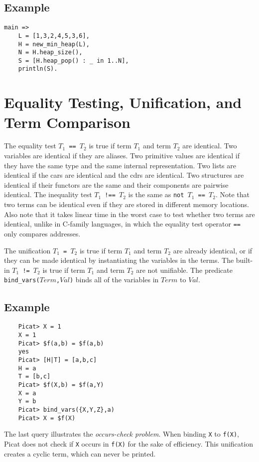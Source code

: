 \subsection*{Example}
\begin{verbatim}
main =>
    L = [1,3,2,4,5,3,6],
    H = new_min_heap(L),
    N = H.heap_size(),
    S = [H.heap_pop() : _ in 1..N],
    println(S).
\end{verbatim}

\section{\label{sec:unification}Equality Testing, Unification, and Term Comparison}
The equality test \texttt{$T_1$ == $T_2$}  is true if term $T_1$ and term $T_2$ are identical. Two variables are identical if they are aliases. Two primitive values are identical if they have the same type and the same internal representation. Two lists are identical if the cars are identical and the cdrs are identical. Two structures are identical if their functors are the same and their components are pairwise identical. The inequality test \texttt{$T_1$ !== $T_2$}  is the same as \texttt{not $T_1$ == $T_2$}.  Note that two terms can be identical even if they are stored in different memory locations.  Also note that it takes linear time in the worst case to test whether two terms are identical, unlike in C-family languages, in which the equality test operator \texttt{==} only compares addresses.

The unification \texttt{$T_1$ = $T_2$}  is true if term $T_1$ and term $T_2$ are already identical, or if they can be made identical by instantiating the variables in the terms. The built-in \texttt{$T_1$ != $T_2$}  is true if term $T_1$ and term $T_2$ are not unifiable. The predicate \texttt{bind\_vars($Term$,$Val$)} binds all of the variables in $Term$ to $Val$.

\subsection*{Example}
\begin{verbatim}
    Picat> X = 1
    X = 1
    Picat> $f(a,b) = $f(a,b)
    yes
    Picat> [H|T] = [a,b,c]
    H = a
    T = [b,c]
    Picat> $f(X,b) = $f(a,Y)
    X = a
    Y = b
    Picat> bind_vars({X,Y,Z},a)
    Picat> X = $f(X)
\end{verbatim}
The last query illustrates the \emph{occurs-check problem}. When binding \texttt{X} to \texttt{f(X)}, Picat does not check if \texttt{X} occurs in \texttt{f(X)} for the sake of efficiency. This unification creates a cyclic term, which can never be printed.

